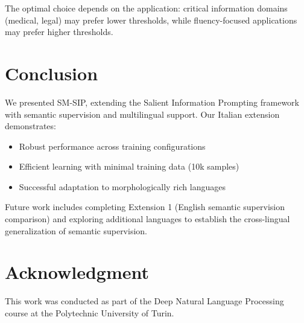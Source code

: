 \documentclass[conference]{IEEEtran}
\begin{document}
The optimal choice depends on the application: critical information domains (medical, legal) may prefer lower thresholds, while fluency-focused applications may prefer higher thresholds.

\section{Conclusion}

We presented SM-SIP, extending the Salient Information Prompting framework with semantic supervision and multilingual support. Our Italian extension demonstrates:

\begin{itemize}
    \item Robust performance across training configurations
    \item Efficient learning with minimal training data (10k samples)
    \item Successful adaptation to morphologically rich languages
\end{itemize}

Future work includes completing Extension 1 (English semantic supervision comparison) and exploring additional languages to establish the cross-lingual generalization of semantic supervision.

\section*{Acknowledgment}

This work was conducted as part of the Deep Natural Language Processing course at the Polytechnic University of Turin.
\end{document}
